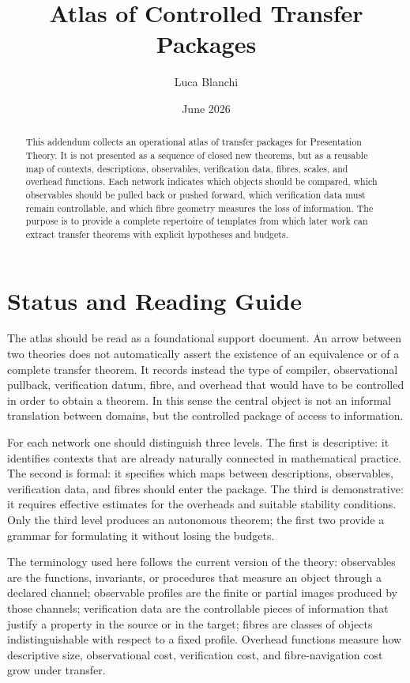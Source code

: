 \documentclass[11pt]{article}
\title{Atlas of Controlled Transfer Packages}
\author{Luca Blanchi}
\date{June 2026}
\begin{document}
\begin{abstract}
This addendum collects an operational atlas of transfer packages for Presentation Theory. It is not presented as a sequence of closed new theorems, but as a reusable map of contexts, descriptions, observables, verification data, fibres, scales, and overhead functions. Each network indicates which objects should be compared, which observables should be pulled back or pushed forward, which verification data must remain controllable, and which fibre geometry measures the loss of information. The purpose is to provide a complete repertoire of templates from which later work can extract transfer theorems with explicit hypotheses and budgets.
\end{abstract}

\section{Status and Reading Guide}
The atlas should be read as a foundational support document. An arrow between two theories does not automatically assert the existence of an equivalence or of a complete transfer theorem. It records instead the type of compiler, observational pullback, verification datum, fibre, and overhead that would have to be controlled in order to obtain a theorem. In this sense the central object is not an informal translation between domains, but the controlled package of access to information.

For each network one should distinguish three levels. The first is descriptive: it identifies contexts that are already naturally connected in mathematical practice. The second is formal: it specifies which maps between descriptions, observables, verification data, and fibres should enter the package. The third is demonstrative: it requires effective estimates for the overheads and suitable stability conditions. Only the third level produces an autonomous theorem; the first two provide a grammar for formulating it without losing the budgets.

The terminology used here follows the current version of the theory: observables are the functions, invariants, or procedures that measure an object through a declared channel; observable profiles are the finite or partial images produced by those channels; verification data are the controllable pieces of information that justify a property in the source or in the target; fibres are classes of objects indistinguishable with respect to a fixed profile. Overhead functions measure how descriptive size, observational cost, verification cost, and fibre-navigation cost grow under transfer.
\end{document}
